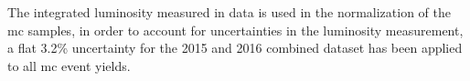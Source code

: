 The integrated luminosity measured in data is used in the normalization of the
\gls{mc} samples, in order to account for uncertainties in the luminosity
measurement, a flat 3.2\% uncertainty for the 2015 and 2016 combined dataset has
been applied to all \gls{mc} event yields.
